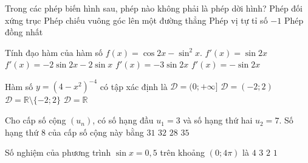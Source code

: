 \begin{ex}%
	Trong các phép biến hình sau, phép nào không phải là phép dời hình?
	\choice
	{Phép đối xứng trục}
	{\True Phép chiếu vuông góc lên một đường thẳng}
	{Phép vị tự tỉ số $-1$}
	{Phép đồng nhất}
\end{ex}
\begin{ex}%
	Tính đạo hàm của hàm số $f(x)=\cos2x-\sin^2x$.
	\choice
	{$f'(x)=\sin2x$}
	{$f'(x)=-2\sin2x-2\sin x$}
	{\True $f'(x)=-3\sin2x$}
	{$f'(x)=-\sin2x$}
\end{ex}
\begin{ex}%
	Hàm số $y=(4-x^2)^{-4}$ có tập xác định là
	\choice
	{$\mathscr{D}=(0;+\infty]$}
	{$\mathscr{D}=(-2;2)$}
	{\True $\mathscr{D}=\mathbb{R}\setminus\{-2;2\}$}
	{$\mathscr{D}=\mathbb{R}$}
\end{ex}
\begin{ex}%
	Cho cấp số cộng $(u_n)$, có số hạng đầu $u_1=3$ và số hạng thứ hai $u_2=7$. Số hạng thứ $8$ của cấp số cộng này bằng
	\choice
	{\True $31$}
	{$32$}
	{$28$}
	{$35$}
\end{ex}
\begin{ex}%
	Số nghiệm của phương trình $\sin x=0{,}5$ trên khoảng  $(0;4\pi)$ là
	\choice
	{\True $4$}
	{$3$}
	{$2$}
	{$1$}
\end{ex}
